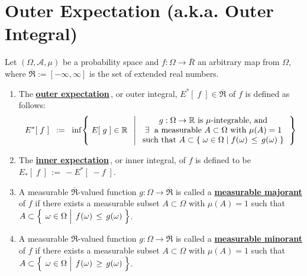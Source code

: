 

\section{Outer Expectation (a.k.a. Outer Integral)}
\setcounter{theorem}{0}
\setcounter{equation}{0}

\renewcommand{\theenumi}{\roman{enumi}}
\renewcommand{\labelenumi}{\textnormal{(\theenumi)}$\;\;$}


\begin{definition}
\label{defn:OuterExpectation}
\mbox{}\vskip 0.1cm
\noindent
Let $(\Omega,\mathcal{A},\mu)$ be a probability space and
$f : \Omega \longrightarrow \overline{R}$
an arbitrary map from $\Omega$, where $\overline{\Re} := [-\infty,\infty]$ is the set of extended real numbers.
\begin{enumerate}
\item
	The \underline{\textbf{outer expectation}}\,, or outer integral,
	$E^{*}\!\left[\;f\;\right] \in \overline{\Re}$
	of $f$ is defined as follows:
	\begin{equation*}
	E^{*}\!\left[\;f\;\right]
	\;\; := \;\;
		\inf\!\left\{\;
			E\!\left[\;g\;\right] \in \Re
			\;\;\left\vert\;
			\begin{array}{c}
				\textnormal{$g:\Omega\rightarrow\Re$ is $\mu$-integrable, and}
				\\
				\textnormal{$\exists$\; a measurable $A \subset \Omega$ with $\mu(A) = 1$}
				\\
				\textnormal{such that $A \subset \{\;\omega\in\Omega\;\vert\;f(\omega) \,\leq\, g(\omega)\;\}$}
			\end{array}
			\right.
			\right\}
	\end{equation*}
\item
	The \underline{\textbf{inner expectation}}\,, or inner integral,
	of $f$ is defined to be
	$E_{*}\!\left[\;f\;\right] \, := \, - E^{*}\!\left[\;- f\;\right]$.
\item
	A measurable $\overline{\Re}$-valued function $g : \Omega\longrightarrow\overline{\Re}$
	is called a \underline{\textbf{measurable majorant}} of $f$ if there exists a measurable
	subset $A \subset \Omega$ with $\mu(A) = 1$ such that
	$A \subset \left\{\;\left.\omega\overset{{\color{white}.}}{\in}\Omega\;\right\vert\;f(\omega) \,\leq\, g(\omega)\;\right\}$.
\item
	A measurable $\overline{\Re}$-valued function $g : \Omega\longrightarrow\overline{\Re}$
	is called a \underline{\textbf{measurable minorant}} of $f$ if there exists a measurable
	subset $A \subset \Omega$ with $\mu(A) = 1$ such that
	$A \subset \left\{\;\left.\omega\overset{{\color{white}.}}{\in}\Omega\;\right\vert\;f(\omega) \,\geq\, g(\omega)\;\right\}$.
\end{enumerate}
\end{definition}

